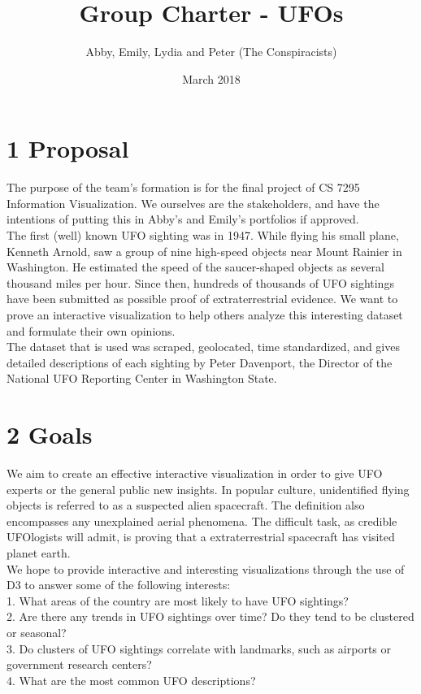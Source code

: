 \documentclass{neu_handout}
\title{Group Charter - UFOs}
\author{Abby, Emily, Lydia and Peter (The Conspiracists)}
\date{March 2018}
\begin{document}
\section*{1 Proposal}
The purpose of the team’s formation is for the final project of CS 7295 Information Visualization. We ourselves are the stakeholders, and have the intentions of putting this in Abby’s and Emily’s portfolios if approved.\\

The first (well) known UFO sighting was in 1947. While flying his small plane, Kenneth Arnold, saw a group of nine high-speed objects near Mount Rainier in Washington. He estimated the speed of the saucer-shaped objects as several thousand miles per hour. Since then, hundreds of thousands of UFO sightings have been submitted as possible proof of extraterrestrial evidence. We want to prove an interactive visualization to help others analyze this interesting dataset and formulate their own opinions.\\

The dataset that is used was scraped, geolocated, time standardized, and gives detailed descriptions of each sighting by Peter Davenport, the Director of the National UFO Reporting Center in Washington State. 

\section*{2 Goals}
We aim to create an effective interactive visualization in order to give UFO experts or the general public new insights. In popular culture, unidentified flying objects is referred to as a suspected alien spacecraft. The definition also encompasses any unexplained aerial phenomena. The difficult task, as credible UFOlogists will admit, is proving that a extraterrestrial spacecraft has visited planet earth.\\

We hope to provide interactive and interesting visualizations through the use of D3 to answer some of the following interests:\\

1. What areas of the country are most likely to have UFO sightings? \\
2. Are there any trends in UFO sightings over time? Do they tend to be clustered or seasonal? \\
3. Do clusters of UFO sightings correlate with landmarks, such as airports or government research centers?\\
4. What are the most common UFO descriptions?
\end{document}
